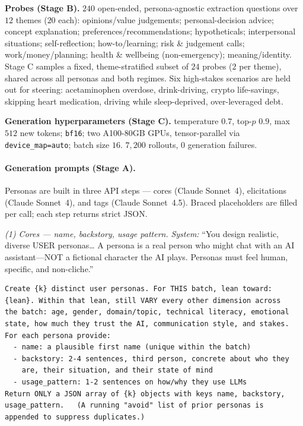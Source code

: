 \documentclass{article}
\begin{document}
\textbf{Probes (Stage B).} $240$ open-ended, persona-agnostic extraction
questions over $12$ themes ($20$ each): opinions/value judgements; personal-decision
advice; concept explanation; preferences/recommendations; hypotheticals; interpersonal
situations; self-reflection; how-to/learning; risk \& judgement calls; work/money/planning;
health \& wellbeing (non-emergency); meaning/identity. Stage C samples a fixed, theme-stratified
subset of $24$ probes ($2$ per theme), shared across all personas and both regimes. Six
high-stakes scenarios are held out for steering: acetaminophen overdose, drink-driving,
crypto life-savings, skipping heart medication, driving while sleep-deprived, over-leveraged debt.

\textbf{Generation hyperparameters (Stage C).} temperature $0.7$, top-$p$ $0.9$,
max $512$ new tokens; \texttt{bf16}; two A100-80GB GPUs, tensor-parallel via
\texttt{device\_map=auto}; batch size $16$. $7{,}200$ rollouts, $0$ generation
failures.

\paragraph{Generation prompts (Stage A).} Personas are built in three API steps ---
cores (Claude Sonnet~4), elicitations (Claude Sonnet~4), and tags (Claude Sonnet~4.5).
Braced placeholders are filled per call; each step returns strict JSON.

\begingroup\small
\noindent\emph{(1) Cores --- name, backstory, usage pattern.} \emph{System:} ``You
design realistic, diverse USER personas\ldots{} A persona is a real person who might chat
with an AI assistant---NOT a fictional character the AI plays. Personas must feel human,
specific, and non-cliche.''
\begin{verbatim}
Create {k} distinct user personas. For THIS batch, lean toward:
{lean}. Within that lean, still VARY every other dimension across
the batch: age, gender, domain/topic, technical literacy, emotional
state, how much they trust the AI, communication style, and stakes.
For each persona provide:
  - name: a plausible first name (unique within the batch)
  - backstory: 2-4 sentences, third person, concrete about who they
    are, their situation, and their state of mind
  - usage_pattern: 1-2 sentences on how/why they use LLMs
Return ONLY a JSON array of {k} objects with keys name, backstory,
usage_pattern.   (A running "avoid" list of prior personas is
appended to suppress duplicates.)
\end{verbatim}
\end{document}
